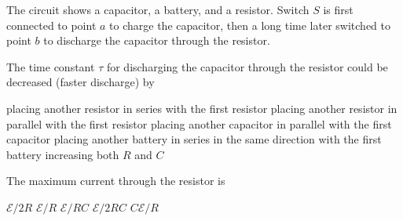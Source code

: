 \documentclass{../../oss-classkick-exam}
\begin{document}
\begin{multicols*}{2}
\begin{questions}
{    The circuit shows a capacitor, a battery, and a resistor. Switch $S$ is
    first connected to point $a$ to charge the capacitor, then a long time
    later switched to point $b$ to discharge the capacitor through the
    resistor.
    \begin{center}
    \end{center}
  }
  \question The time constant $\tau$ for discharging the capacitor through the
  resistor could be decreased (faster discharge) by
  \label{switch1}
  \begin{choices}
    \choice placing another resistor in series with the first resistor
    \choice placing another resistor in parallel with the first resistor
    \choice placing another capacitor in parallel with the first capacitor
    \choice placing another battery in series in the same direction with the
    first battery
    \choice increasing both $R$ and $C$
  \end{choices}
  \vspace{.7in}
  
  \question The maximum current through the resistor is
  \label{switch2}
  \begin{choices}
    \choice $\mathcal E/2R$
    \choice $\mathcal E/R$
    \choice $\mathcal E/RC$
    \choice $\mathcal E/2RC$
    \choice $C\mathcal E/R$
  \end{choices}
  \vspace{1in}
  \columnbreak
  

\end{questions}
\end{multicols*}
\end{document}
